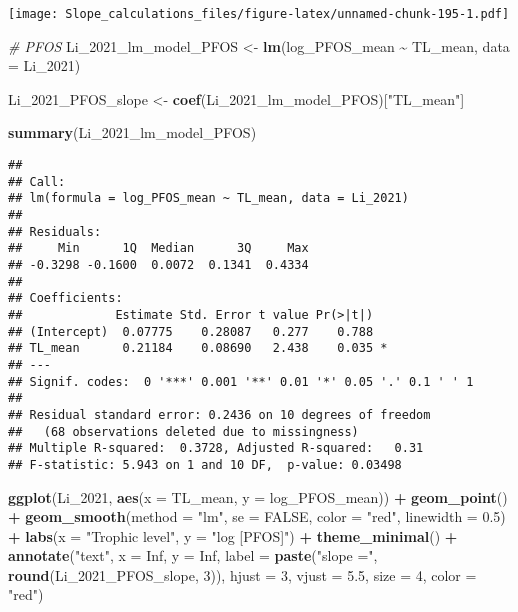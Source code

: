 \documentclass[
]{article}
\newenvironment{Shaded}{\begin{snugshade}}{\end{snugshade}}
\newcommand{\AttributeTok}[1]{\textcolor[rgb]{0.13,0.29,0.53}{#1}}
\newcommand{\CommentTok}[1]{\textcolor[rgb]{0.56,0.35,0.01}{\textit{#1}}}
\newcommand{\ConstantTok}[1]{\textcolor[rgb]{0.56,0.35,0.01}{#1}}
\newcommand{\DecValTok}[1]{\textcolor[rgb]{0.00,0.00,0.81}{#1}}
\newcommand{\FloatTok}[1]{\textcolor[rgb]{0.00,0.00,0.81}{#1}}
\newcommand{\FunctionTok}[1]{\textcolor[rgb]{0.13,0.29,0.53}{\textbf{#1}}}
\newcommand{\NormalTok}[1]{#1}
\newcommand{\OtherTok}[1]{\textcolor[rgb]{0.56,0.35,0.01}{#1}}
\newcommand{\SpecialCharTok}[1]{\textcolor[rgb]{0.81,0.36,0.00}{\textbf{#1}}}
\newcommand{\StringTok}[1]{\textcolor[rgb]{0.31,0.60,0.02}{#1}}
\begin{document}
\texttt{[image: Slope\_calculations\_files/figure-latex/unnamed-chunk-195-1.pdf]}

\begin{Shaded}
\begin{Highlighting}[]
\CommentTok{\# PFOS}
\NormalTok{Li\_2021\_lm\_model\_PFOS }\OtherTok{\textless{}{-}} \FunctionTok{lm}\NormalTok{(log\_PFOS\_mean }\SpecialCharTok{\textasciitilde{}}\NormalTok{ TL\_mean,}
                                    \AttributeTok{data =}\NormalTok{ Li\_2021)}

\NormalTok{Li\_2021\_PFOS\_slope }\OtherTok{\textless{}{-}} \FunctionTok{coef}\NormalTok{(Li\_2021\_lm\_model\_PFOS)[}\StringTok{"TL\_mean"}\NormalTok{]}

\FunctionTok{summary}\NormalTok{(Li\_2021\_lm\_model\_PFOS)}
\end{Highlighting}
\end{Shaded}

\begin{verbatim}
## 
## Call:
## lm(formula = log_PFOS_mean ~ TL_mean, data = Li_2021)
## 
## Residuals:
##     Min      1Q  Median      3Q     Max 
## -0.3298 -0.1600  0.0072  0.1341  0.4334 
## 
## Coefficients:
##             Estimate Std. Error t value Pr(>|t|)  
## (Intercept)  0.07775    0.28087   0.277    0.788  
## TL_mean      0.21184    0.08690   2.438    0.035 *
## ---
## Signif. codes:  0 '***' 0.001 '**' 0.01 '*' 0.05 '.' 0.1 ' ' 1
## 
## Residual standard error: 0.2436 on 10 degrees of freedom
##   (68 observations deleted due to missingness)
## Multiple R-squared:  0.3728, Adjusted R-squared:   0.31 
## F-statistic: 5.943 on 1 and 10 DF,  p-value: 0.03498
\end{verbatim}

\begin{Shaded}
\begin{Highlighting}[]
\FunctionTok{ggplot}\NormalTok{(Li\_2021, }\FunctionTok{aes}\NormalTok{(}\AttributeTok{x =}\NormalTok{ TL\_mean, }\AttributeTok{y =}\NormalTok{ log\_PFOS\_mean)) }\SpecialCharTok{+}
  \FunctionTok{geom\_point}\NormalTok{() }\SpecialCharTok{+}
  \FunctionTok{geom\_smooth}\NormalTok{(}\AttributeTok{method =} \StringTok{"lm"}\NormalTok{, }\AttributeTok{se =} \ConstantTok{FALSE}\NormalTok{, }\AttributeTok{color =} \StringTok{"red"}\NormalTok{, }\AttributeTok{linewidth =} \FloatTok{0.5}\NormalTok{) }\SpecialCharTok{+}
  \FunctionTok{labs}\NormalTok{(}\AttributeTok{x =} \StringTok{"Trophic level"}\NormalTok{,}
       \AttributeTok{y =} \StringTok{"log [PFOS]"}\NormalTok{) }\SpecialCharTok{+}
  \FunctionTok{theme\_minimal}\NormalTok{() }\SpecialCharTok{+}
  \FunctionTok{annotate}\NormalTok{(}\StringTok{"text"}\NormalTok{, }\AttributeTok{x =} \ConstantTok{Inf}\NormalTok{, }\AttributeTok{y =} \ConstantTok{Inf}\NormalTok{, }\AttributeTok{label =} \FunctionTok{paste}\NormalTok{(}\StringTok{"slope ="}\NormalTok{, }\FunctionTok{round}\NormalTok{(Li\_2021\_PFOS\_slope, }\DecValTok{3}\NormalTok{)), }
           \AttributeTok{hjust =} \DecValTok{3}\NormalTok{, }\AttributeTok{vjust =} \FloatTok{5.5}\NormalTok{, }\AttributeTok{size =} \DecValTok{4}\NormalTok{, }\AttributeTok{color =} \StringTok{"red"}\NormalTok{)}
\end{Highlighting}
\end{Shaded}
\end{document}
